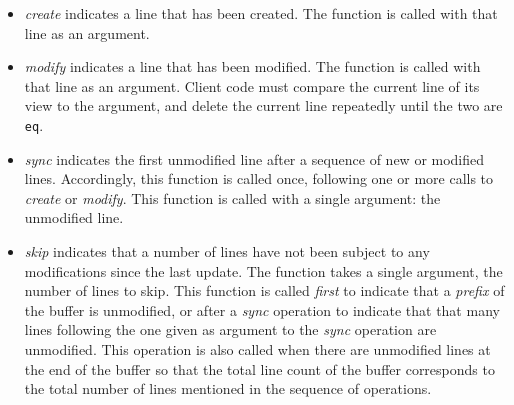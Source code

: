 \begin{itemize}
\item \textit{create} indicates a line that has been created.  The
  function is called with that line as an argument.
\item \textit{modify} indicates a line that has been modified.  The
  function is called with that line as an argument.  Client code must
  compare the current line of its view to the argument, and delete the
  current line repeatedly until the two are \texttt{eq}.
\item \textit{sync} indicates the first unmodified line after a
  sequence of new or modified lines.  Accordingly, this function is
  called once, following one or more calls to \textit{create} or
  \textit{modify}.  This function is called with a single argument:
  the unmodified line.
\item \textit{skip} indicates that a number of lines have not been
  subject to any modifications since the last update.  The function
  takes a single argument, the number of lines to skip.  This function
  is called \emph{first} to indicate that a \emph{prefix} of the
  buffer is unmodified, or after a \emph{sync} operation to indicate
  that that many lines following the one given as argument to the
  \textit{sync} operation are unmodified.  This operation is also
  called when there are unmodified lines at the end of the buffer so
  that the total line count of the buffer corresponds to the total
  number of lines mentioned in the sequence of operations.
\end{itemize}

